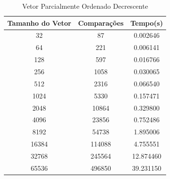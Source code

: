 \documentclass[12pt,a4paper,twoside]{report}
\begin{document}
\begin{table}[h]
  \centering
  \caption{Vetor Parcialmente Ordenado Decrescente \label{tab:pod}}
  \begin{tabular}{ccc} \\\hline
  \textbf{Tamanho do Vetor} & \textbf{Comparações} & \textbf{Tempo(s)} \\\hline
  32                        & 87                   & 0.002646          \\\hline
  64                        & 221                  & 0.006141          \\\hline
  128                       & 597                  & 0.016766          \\\hline
  256                       & 1058                 & 0.030065          \\\hline
  512                       & 2316                 & 0.066540          \\\hline
  1024                      & 5330                 & 0.157471          \\\hline
  2048                      & 10864                & 0.329800          \\\hline
  4096                      & 23856                & 0.752486         \\\hline
  8192                      & 54738                & 1.895006        \\\hline
  16384                     & 114088               & 4.755551        \\\hline
  32768                     & 245564               & 12.874460        \\\hline
  65536                     & 496850               & 39.231150        \\\hline
  \end{tabular}
\end{table}
\end{document}
